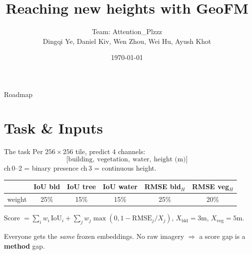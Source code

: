 \documentclass[aspectratio=169,11pt]{beamer}
\title{Reaching new heights with GeoFM}
\author{Team: Attention\_Plzzz\\[2pt]
  \small Dingqi Ye, Daniel Kiv, Wen Zhou, Wei Hu, Ayush Khot}
\institute{CyberGIS Center for Advanced Digital and Spatial Studies\\
  University of Illinois at Urbana-Champaign}
\date{\today}
\begin{document}
\maketitle

\begin{frame}{Roadmap}\tableofcontents\end{frame}

\section{Task \& Inputs}

\begin{frame}{The task}
  Per $256\times256$ tile, predict 4 channels:
  \[\big[\text{building},\ \text{vegetation},\ \text{water},\ \text{height (m)}\big]\]
  ch\,0--2 = binary presence \quad ch\,3 = continuous height.

  \vspace{0.5em}
  \begin{center}\small
  \begin{tabular}{lccccc}
    \toprule
    & IoU bld & IoU tree & IoU water & RMSE bld$_H$ & RMSE veg$_H$\\
    \midrule
    weight & 25\% & 15\% & 15\% & 25\% & 20\%\\
    \bottomrule
  \end{tabular}
  \end{center}
  \footnotesize Score $=\sum_i w_i\,\text{IoU}_i+\sum_j w_j\max(0,1-\text{RMSE}_j/X_j)$,
  $X_{\text{bld}}{=}3$m, $X_{\text{veg}}{=}5$m.

  \vspace{0.5em}
  \normalsize\alert{Everyone gets the \emph{same} frozen embeddings.}
  No raw imagery $\Rightarrow$ a score gap is a \textbf{method} gap.
\end{frame}
\end{document}
